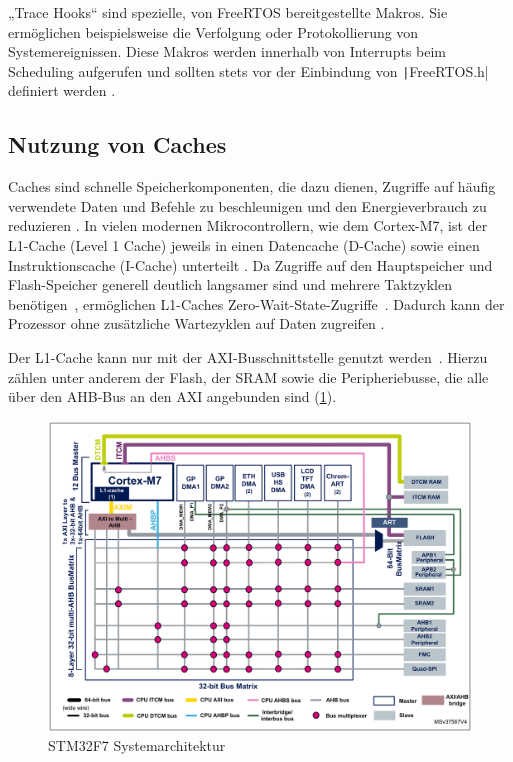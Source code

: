 „Trace Hooks“ sind spezielle, von FreeRTOS bereitgestellte Makros. Sie
ermöglichen beispielsweise die Verfolgung oder Protokollierung von
Systemereignissen. Diese Makros werden innerhalb von Interrupts beim Scheduling
aufgerufen und sollten stets vor der Einbindung von
\texttt|FreeRTOS.h| definiert werden \cite{freertos_rtos_trace_hooks}.

\subsection{Nutzung von Caches}

Caches sind schnelle Speicherkomponenten, die dazu dienen, Zugriffe auf häufig
verwendete Daten und Befehle zu beschleunigen und den Energieverbrauch zu
reduzieren \cite{ka001150}. In vielen modernen Mikrocontrollern, wie dem
Cortex-M7, ist der L1-Cache (Level 1 Cache) jeweils in einen Datencache
(D-Cache) sowie einen Instruktionscache (I-Cache) unterteilt \cite[S.
6]{an4667}. Da Zugriffe auf den Hauptspeicher und Flash-Speicher generell
deutlich langsamer sind und mehrere Taktzyklen
benötigen~\cite{stm32_memory_sections}, ermöglichen L1-Caches
Zero-Wait-State-Zugriffe~\cite[S. 6]{an4667}. Dadurch kann der Prozessor ohne
zusätzliche Wartezyklen auf Daten zugreifen \cite{waitstate_wiki}.

Der L1-Cache kann nur mit der \ac{AXI}-Busschnittstelle genutzt werden~\cite[S.
4]{an4839}. Hierzu zählen unter anderem der Flash, der \ac{SRAM} sowie die
Peripheriebusse, die alle über den \ac{AHB}-Bus an den AXI angebunden sind
(\ref{fig:m7_sys_arch}).

\begin{figure}[htb]
    \centering
    \includegraphics[width=1\textwidth]{assets/m7_system_arch}
    \caption{STM32F7 Systemarchitektur \cite[S. 9]{an4667}}
    \label{fig:m7_sys_arch}
\end{figure}

